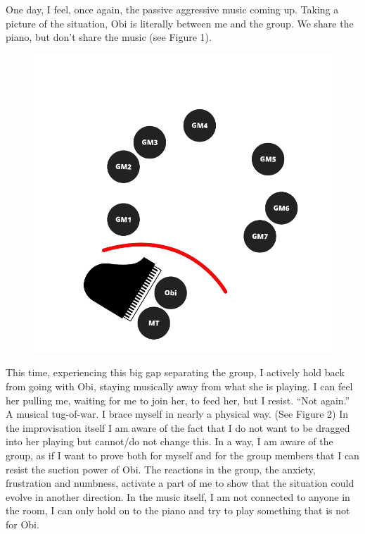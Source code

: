 \documentclass[authordate, empirical, issue]{jote-new-article}
\begin{document}
One day, I feel, once again, the passive aggressive music coming up. Taking a picture of the situation, Obi is literally between me and the group. We share the piano, but don't share the music (see Figure 1).



\begin{figure}

  \includegraphics[width=\linewidth]{media/image1.png}

  \caption{}

  \label{fig:rId5}


\end{figure}



This time, experiencing this big gap separating the group, I actively hold back from going with Obi, staying musically away from what she is playing. I can feel her pulling me, waiting for me to join her, to feed her, but I resist. “Not again.” A musical tug-of-war. I brace myself in nearly a physical way. (See Figure 2) In the improvisation itself I am aware of the fact that I do not want to be dragged into her playing but cannot/do not change this. In a way, I am aware of the group, as if I want to prove both for myself and for the group members that I can resist the suction power of Obi. The reactions in the group, the anxiety, frustration and numbness, activate a part of me to show that the situation could evolve in another direction. In the music itself, I am not connected to anyone in the room, I can only hold on to the piano and try to play something that is not for Obi.
\end{document}
